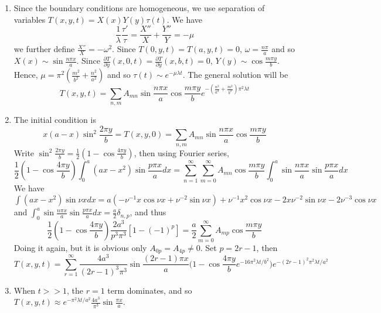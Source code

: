 \documentclass[a4paper]{article}
\begin{document}
\begin{ans}\leavevmode
\begin{enumerate}[label=(\alph*)]
\item  Since the boundary conditions are homogeneous, we use separation of variables $T(x,y,t)=X(x)Y(y)\tau(t)$. We have
$$\frac{1}{\lambda}\frac{\tau'}{\tau}=\frac{X''}{X}+\frac{Y''}{Y}=-\mu$$
we further define $\frac{X''}{X}=-\omega^2$. Since $T(0,y,t)=T(a,y,t)=0$, $\omega=\frac{n\pi}{a}$ and so $X(x)\sim\sin\frac{n\pi x}{a}$. Since $\frac{\partial T}{\partial y}(x,0,t)=\frac{\partial T}{\partial y}(x,b,t)=0$, $Y(y)\sim\cos\frac{m\pi y}{b}$. Hence, $\mu=\pi^2(\frac{m^2}{b^2}+\frac{n^2}{a^2})$ and so $\tau(t)\sim e^{-\mu\lambda t}$. The general solution will be
$$T(x,y,t)=\sum_{n,m}A_{mn}\sin\frac{n\pi x}{a}\cos\frac{m\pi y}{b}e^{-(\frac{n^2}{a^2}+\frac{m^2}{b^2})\pi^2\lambda t}$$
\item The initial condition is
$$x(a-x)\sin^2\frac{2\pi y}{b}=T(x,y,0)=\sum_{n,m}A_{mn}\sin\frac{n\pi x}{a}\cos\frac{m\pi y}{b}$$
Write $\sin^2\frac{2\pi y}{b}=\frac{1}{2}(1-\cos\frac{4\pi y}{b})$, then using Fourier series,
$$\frac{1}{2}(1-\cos\frac{4\pi y}{b})\int_0^a(ax-x^2)\sin\frac{p\pi x}{a}dx=\sum_{n=1}^\infty\sum_{m=0}^\infty A_{mn}\cos\frac{m\pi y}{b}\int_0^a\sin\frac{n\pi x}{a}\sin\frac{p\pi x}{a}dx$$
We have $\int(ax-x^2)\sin\nu xdx=a(-\nu^{-1}x\cos\nu x+\nu^{-2}\sin\nu x)+\nu^{-1}x^2\cos\nu x-2x\nu^{-2}\sin\nu x-2\nu^{-3}\cos\nu x$ and $\int_0^a\sin\frac{n\pi x}{a}\sin\frac{p\pi x}{a}dx=\frac{a}{2}\delta_{n,p}$, and thus
$$\frac{1}{2}(1-\cos\frac{4\pi y}{b})\frac{2a^3}{p^3\pi^3}[1-(-1)^p]=\frac{a}{2}\sum_{m=0}^\infty A_{mp}\cos\frac{m\pi y}{b}$$
Doing it again, but it is obvious only $A_{0p}=A_{4p}\neq 0$. Set $p=2r-1$, then
$$T(x,y,t)=\sum_{r=1}^\infty\frac{4a^3}{(2r-1)^3\pi^3}\sin\frac{(2r-1)\pi x}{a}\bigg(1-\cos\frac{4\pi y}{b}e^{-16\pi^2\lambda t/b^2}\bigg)e^{-(2r-1)^2\pi^2\lambda t/a^2}$$
\item When $t>>1$, the $r=1$ term dominates, and so $T(x,y,t)\approx e^{-\pi^2\lambda t/a^2}\frac{4a^3}{\pi^3}\sin\frac{\pi x}{a}$.
\end{enumerate}
\end{ans}
\newpage
\end{document}
